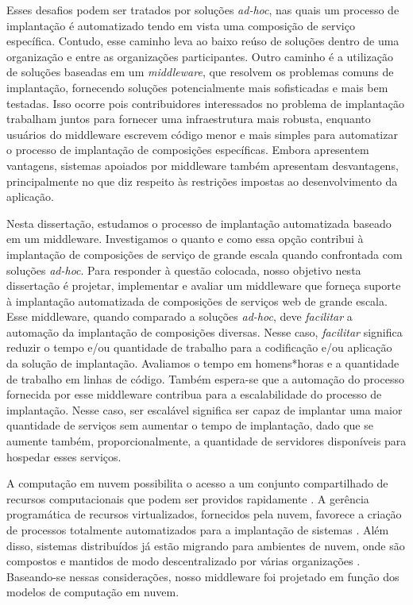 Esses desafios podem ser tratados por soluções \emph{ad-hoc},
nas quais um processo de implantação é automatizado tendo em vista
uma composição de serviço específica.
Contudo, esse caminho leva ao baixo reúso de soluções
dentro de uma organização e entre as organizações participantes.
Outro caminho é a utilização de soluções baseadas em um \emph{middleware},
que resolvem os problemas comuns de implantação,
fornecendo soluções potencialmente mais sofisticadas e mais bem testadas.
Isso ocorre pois contribuidores interessados no problema de implantação
trabalham juntos para fornecer uma infraestrutura mais robusta,
enquanto usuários do middleware escrevem código menor e mais simples
para automatizar o processo de implantação de composições específicas.
Embora apresentem vantagens, sistemas apoiados por middleware
também apresentam desvantagens, principalmente no que diz respeito
às restrições impostas ao desenvolvimento da aplicação.

Nesta dissertação, estudamos o processo de implantação automatizada baseado em um middleware. 
Investigamos o quanto e como essa opção
contribui à implantação de composições de serviço de grande escala
quando confrontada com soluções \emph{ad-hoc}.
Para responder à questão colocada, nosso objetivo nesta dissertação é 
projetar, implementar e avaliar
um middleware que forneça suporte à implantação automatizada de composições de serviços web
de grande escala.
Esse middleware, quando comparado a soluções \emph{ad-hoc},
deve \emph{facilitar} a automação da implantação de composições diversas.
Nesse caso, \emph{facilitar} significa reduzir o tempo e/ou quantidade de trabalho
para a codificação e/ou aplicação da solução de implantação.
Avaliamos o tempo em homens*horas e a quantidade de trabalho
em linhas de código.
Também espera-se que a automação do processo fornecida por esse middleware
contribua para a escalabilidade do processo de implantação.
Nesse caso, ser escalável significa ser capaz de implantar uma maior quantidade
de serviços sem aumentar o tempo de implantação, dado que se aumente também,
proporcionalmente, a quantidade de servidores disponíveis para hospedar esses serviços.

A computação em nuvem possibilita o acesso a um conjunto compartilhado de recursos computacionais que podem ser providos rapidamente \cite{Nist2011Cloud}.
A gerência programática de recursos virtualizados, fornecidos pela nuvem, favorece a criação de processos totalmente automatizados para a implantação de sistemas \cite{Humble2011Continuous}.   
Além disso, sistemas distribuídos já estão migrando para ambientes de nuvem, onde são compostos e mantidos de modo descentralizado por várias organizações \cite{Steen2011VeryLarge}.
Baseando-se nessas considerações, nosso middleware foi projetado em função dos modelos de computação em nuvem.

